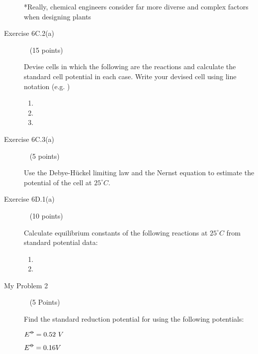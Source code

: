\documentclass[12pt, openany, letterpaper]{memoir}
\begin{document}
\begin{description}
	\vspace{7em}
	*Really, chemical engineers consider far more diverse and complex factors when designing plants
	
	\vspace{2em}
	\item [Exercise 6C.2(a)] ~ (15 points)
	
	Devise cells in which the following are the reactions and calculate the standard cell potential in each case. Write your devised cell using line notation (e.g. )
	\begin{enumerate}
		\item {}
		
		\vspace{6em}
		\item {}
		
		\vspace{6em}
		\item {}
	\end{enumerate}
	
	\vspace{6em}
	
	\item [Exercise 6C.3(a)] ~ (5 points)
	
	Use the Debye-H\"uckel limiting law and the Nernst equation to estimate the potential of the cell  at $25^\circ C$.
	
	\vspace{25em}
	\item [Exercise 6D.1(a)] ~ (10 points)
	
	Calculate equilibrium constants of the following reactions at $25^\circ C$ from standard potential data:
	\begin{enumerate}
		\item {}
		
		\vspace{13em}
		\item {}
	\end{enumerate}

	\vspace{13em}
	\item [My Problem 2] ~ (5 Points)
	
	Find the standard reduction potential for  using the following potentials:
	
	 \hspace{2em}$E^{\std} = 0.52~V$
	
	 \hspace{2em}$E^{\std} = 0.16V$
	
	
\end{description}
\end{document}
